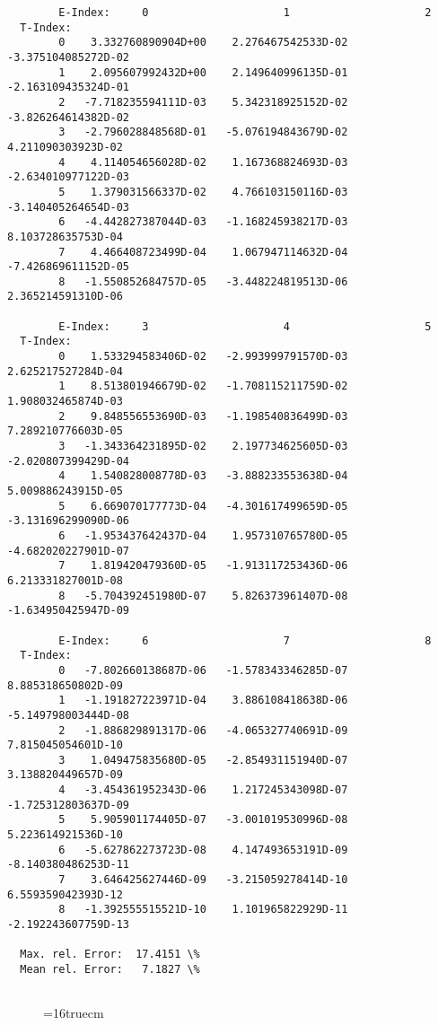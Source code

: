 \documentclass[12pt,dvipdfmx]{article}
\begin{document}
\begin{small}\begin{verbatim}
        E-Index:     0                     1                     2
  T-Index:
        0    3.332760890904D+00    2.276467542533D-02   -3.375104085272D-02
        1    2.095607992432D+00    2.149640996135D-01   -2.163109435324D-01
        2   -7.718235594111D-03    5.342318925152D-02   -3.826264614382D-02
        3   -2.796028848568D-01   -5.076194843679D-02    4.211090303923D-02
        4    4.114054656028D-02    1.167368824693D-03   -2.634010977122D-03
        5    1.379031566337D-02    4.766103150116D-03   -3.140405264654D-03
        6   -4.442827387044D-03   -1.168245938217D-03    8.103728635753D-04
        7    4.466408723499D-04    1.067947114632D-04   -7.426869611152D-05
        8   -1.550852684757D-05   -3.448224819513D-06    2.365214591310D-06

        E-Index:     3                     4                     5
  T-Index:
        0    1.533294583406D-02   -2.993999791570D-03    2.625217527284D-04
        1    8.513801946679D-02   -1.708115211759D-02    1.908032465874D-03
        2    9.848556553690D-03   -1.198540836499D-03    7.289210776603D-05
        3   -1.343364231895D-02    2.197734625605D-03   -2.020807399429D-04
        4    1.540828008778D-03   -3.888233553638D-04    5.009886243915D-05
        5    6.669070177773D-04   -4.301617499659D-05   -3.131696299090D-06
        6   -1.953437642437D-04    1.957310765780D-05   -4.682020227901D-07
        7    1.819420479360D-05   -1.913117253436D-06    6.213331827001D-08
        8   -5.704392451980D-07    5.826373961407D-08   -1.634950425947D-09

        E-Index:     6                     7                     8
  T-Index:
        0   -7.802660138687D-06   -1.578343346285D-07    8.885318650802D-09
        1   -1.191827223971D-04    3.886108418638D-06   -5.149798003444D-08
        2   -1.886829891317D-06   -4.065327740691D-09    7.815045054601D-10
        3    1.049475835680D-05   -2.854931151940D-07    3.138820449657D-09
        4   -3.454361952343D-06    1.217245343098D-07   -1.725312803637D-09
        5    5.905901174405D-07   -3.001019530996D-08    5.223614921536D-10
        6   -5.627862273723D-08    4.147493653191D-09   -8.140380486253D-11
        7    3.646425627446D-09   -3.215059278414D-10    6.559359042393D-12
        8   -1.392555515521D-10    1.101965822929D-11   -2.192243607759D-13

  Max. rel. Error:  17.4151 \%
  Mean rel. Error:   7.1827 \%


\end{verbatim}\end{small}
\begin{figure} \label{2.1.8lr2o}
\epsfxsize=16truecm
\end{figure}
\newpage
\end{document}
